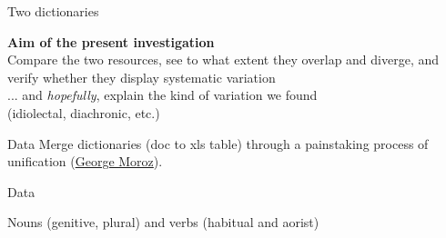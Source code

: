 \begin{frame}{Two dictionaries}

\begin{center}
    \textbf{Aim of the present investigation}\\
    Compare the two resources, see to what extent they overlap and diverge, and verify whether they display systematic variation\\
    ...
    \pause
    \vfill
    and \textit{hopefully}, explain the kind of variation we found\\ (idiolectal, diachronic, etc.) 
    
\end{center}

\end{frame}

\begin{frame}{Data}
Merge dictionaries (doc to xls table) through a painstaking process of unification (\href{https://github.com/agricolamz/}{George Moroz}).

\begin{figure}[h]
\centering
{}
\end{figure}
\end{frame}

\begin{frame}{Data}

Nouns (genitive, plural) and verbs (habitual and aorist)

\begin{figure}[h]
\centering
{}
\end{figure}
\end{frame}


